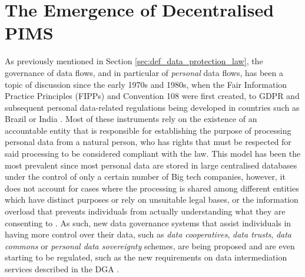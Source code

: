 \section{The Emergence of Decentralised PIMS}
\label{sec:motivation_legal}

As previously mentioned in Section \ref{sec:def_data_protection_law}, the governance of data flows, and in particular of \textit{personal} data flows, has been a topic of discussion since the early 1970s and 1980s, when the Fair Information Practice Principles (FIPPs) \citep{cate_failure_2006} and Convention 108 \citep{council_of_europe_convention_1981} were first created, to GDPR and subsequent personal data-related regulations being developed in countries such as Brazil or India \citep{bradford_brussels_2019}.
Most of these instruments rely on the existence of an accountable entity that is responsible for establishing the purpose of processing personal data from a natural person, who has rights that must be respected for said processing to be considered compliant with the law.
This model has been the most prevalent since most personal data are stored in large centralised databases under the control of only a certain number of Big tech companies, however, it does not account for cases where the processing is shared among different entities which have distinct purposes or rely on unsuitable legal bases, or the information overload that prevents individuals from actually understanding what they are consenting to \citep{benshahar_more_2014}.
As such, new data governance systems that assist individuals in having more control over their data, such as \textit{data cooperatives}, \textit{data trusts}, \textit{data commons} or \textit{personal data sovereignty} schemes, are being proposed \citep{viljoen_relational_2021,craglia_digitranscope_2021} and are even starting to be regulated, such as the new requirements on data intermediation services described in the DGA \citeyearpar{noauthor_regulation_2022}.

